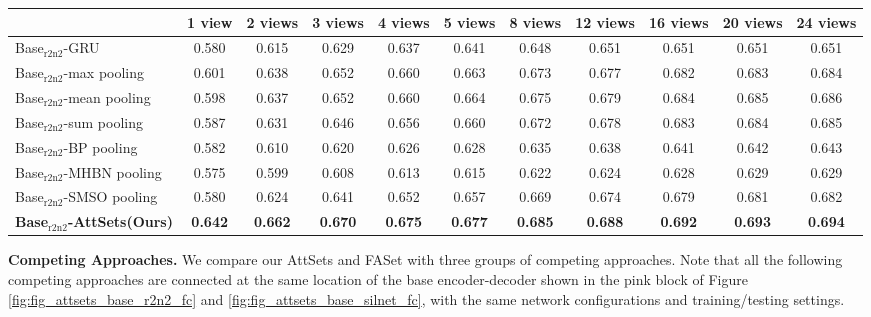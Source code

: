 \documentclass[twocolumn]{svjour3}    \pdfoutput=1
\newcommand{\nickname}{AttSets}
\newcommand{\faset}{FASet}
\newcommand{\ie}{\textit{i}.\textit{e}., }
\begin{document}
\begin{table*}[t]
\caption{Group 5: mean IoU for multi-view reconstruction of all 13 categories in ShapeNet$_{\textrm{r2n2}}$ testing split. All networks are firstly trained given only 1 image for each object in Stage 1. The \nickname{} module is further trained given random number of images per object in Stage 2, \ie $N$ is uniformly sampled from \textbf{[1, 24]}, while other competing approaches are fine-tuned given random number of views per object in Stage 2.}
\centering
\label{tab:iou_r2n2_allv}
\tabcolsep=0.125cm
\begin{tabular}{ l|cccccccccc}
\hline
&1 view&2 views&3 views& 4 views&5 views&8 views&12 views&16 views&20 views&24 views \\
\hline
Base$_{\textrm{r2n2}}$-GRU &0.580&0.615&0.629&0.637&0.641&0.648&0.651&0.651&0.651&0.651 \\
Base$_{\textrm{r2n2}}$-max pooling &0.601&0.638&0.652&0.660&0.663&0.673&0.677&0.682&0.683&0.684 \\
Base$_{\textrm{r2n2}}$-mean pooling &0.598&0.637&0.652&0.660&0.664&0.675&0.679&0.684&0.685&0.686 \\
Base$_{\textrm{r2n2}}$-sum pooling &0.587&0.631&0.646&0.656&0.660&0.672&0.678&0.683&0.684&0.685 \\
Base$_{\textrm{r2n2}}$-BP pooling &0.582&0.610&0.620&0.626&0.628&0.635&0.638&0.641&0.642&0.643 \\
Base$_{\textrm{r2n2}}$-MHBN pooling &0.575&0.599&0.608&0.613&0.615&0.622&0.624&0.628&0.629&0.629 \\
Base$_{\textrm{r2n2}}$-SMSO pooling &0.580&0.624&0.641&0.652&0.657&0.669&0.674&0.679&0.681&0.682 \\
\textbf{Base$_{\textrm{r2n2}}$-\nickname{}(Ours)} &\textbf{0.642}&\textbf{0.662}&\textbf{0.670}&\textbf{0.675}&\textbf{0.677}&\textbf{0.685}
&\textbf{0.688}&\textbf{0.692}&\textbf{0.693}&\textbf{0.694} \\
\hline
\end{tabular}
\vspace{-0.1 cm}
\end{table*}

\textbf{Competing Approaches.} We compare our \nickname{} and \faset{} with three groups of competing approaches. Note that all the following competing approaches are connected at the same location of the base encoder-decoder shown in the pink block of Figure \ref{fig:fig_attsets_base_r2n2_fc} and \ref{fig:fig_attsets_base_silnet_fc}, with the same network configurations and training/testing settings.
\end{document}
